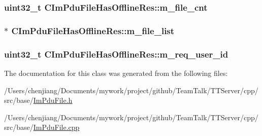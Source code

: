 \subsubsection[{m\+\_\+file\+\_\+cnt}]{\setlength{\rightskip}{0pt plus 5cm}uint32\+\_\+t C\+Im\+Pdu\+File\+Has\+Offline\+Res\+::m\+\_\+file\+\_\+cnt\hspace{0.3cm}{\ttfamily [private]}}\label{class_c_im_pdu_file_has_offline_res_a82aaeede43da70cf60ca1465ca7c7644}
\hypertarget{class_c_im_pdu_file_has_offline_res_a8968561b98e379ded80c2edb227837ea}{}
\subsubsection[{m\+\_\+file\+\_\+list}]{$\ast$ C\+Im\+Pdu\+File\+Has\+Offline\+Res\+::m\+\_\+file\+\_\+list\hspace{0.3cm}{\ttfamily [private]}}\label{class_c_im_pdu_file_has_offline_res_a8968561b98e379ded80c2edb227837ea}
\hypertarget{class_c_im_pdu_file_has_offline_res_a4a3ed74e9c5aa79abdc56fd551279cfb}{}
\subsubsection[{m\+\_\+req\+\_\+user\+\_\+id}]{\setlength{\rightskip}{0pt plus 5cm}uint32\+\_\+t C\+Im\+Pdu\+File\+Has\+Offline\+Res\+::m\+\_\+req\+\_\+user\+\_\+id\hspace{0.3cm}{\ttfamily [private]}}\label{class_c_im_pdu_file_has_offline_res_a4a3ed74e9c5aa79abdc56fd551279cfb}


The documentation for this class was generated from the following files\+:\begin{DoxyCompactItemize}
\item 
/\+Users/chenjiang/\+Documents/mywork/project/github/\+Team\+Talk/\+T\+T\+Server/cpp/src/base/\hyperlink{_im_pdu_file_8h}{Im\+Pdu\+File.\+h}\item 
/\+Users/chenjiang/\+Documents/mywork/project/github/\+Team\+Talk/\+T\+T\+Server/cpp/src/base/\hyperlink{_im_pdu_file_8cpp}{Im\+Pdu\+File.\+cpp}\end{DoxyCompactItemize}
